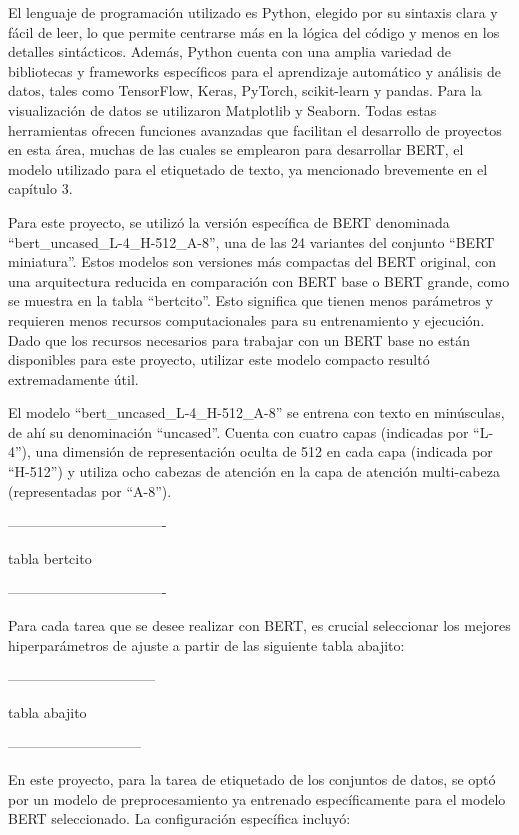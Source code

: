 El lenguaje de programación utilizado es Python, elegido por su sintaxis clara y fácil de leer, lo que permite centrarse más en la lógica del código y menos en los detalles sintácticos. Además, Python cuenta con una amplia variedad de bibliotecas y frameworks específicos para el aprendizaje automático y análisis de datos, tales como TensorFlow, Keras, PyTorch, scikit-learn y pandas. Para la visualización de datos se utilizaron Matplotlib y Seaborn. Todas estas herramientas ofrecen funciones avanzadas que facilitan el desarrollo de proyectos en esta área, muchas de las cuales se emplearon para desarrollar BERT, el modelo utilizado para el etiquetado de texto, ya mencionado brevemente en el capítulo 3.


Para este proyecto, se utilizó la versión específica de BERT denominada ``bert\_uncased\_L-4\_H-512\_A-8'', una de las 24 variantes del conjunto ``BERT miniatura''. Estos modelos son versiones más compactas del BERT original, con una arquitectura reducida en comparación con BERT base o BERT grande, como se muestra en la tabla ``bertcito''. Esto significa que tienen menos parámetros y requieren menos recursos computacionales para su entrenamiento y ejecución. Dado que los recursos necesarios para trabajar con un BERT base no están disponibles para este proyecto, utilizar este modelo compacto resultó extremadamente útil.

El modelo ``bert\_uncased\_L-4\_H-512\_A-8'' se entrena con texto en minúsculas, de ahí su denominación ``uncased''. Cuenta con cuatro capas (indicadas por ``L-4''), una dimensión de representación oculta de 512 en cada capa (indicada por ``H-512'') y utiliza ocho cabezas de atención en la capa de atención multi-cabeza (representadas por ``A-8'').

----------------------------------

tabla bertcito

----------------------------------

Para cada tarea que se desee realizar con BERT, es crucial seleccionar los mejores hiperparámetros de ajuste a partir de las siguiente tabla abajito:

--------------------------------

tabla abajito

-----------------------------

En este proyecto, para la tarea de etiquetado de los conjuntos de datos, se optó por un modelo de preprocesamiento ya entrenado específicamente para el modelo BERT seleccionado. La configuración específica incluyó:

